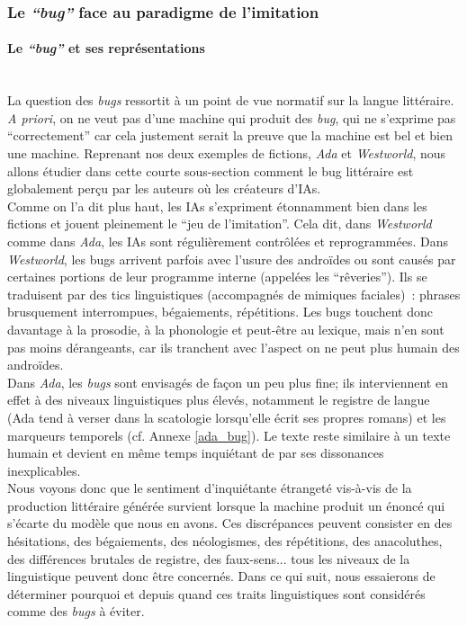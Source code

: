 \documentclass{article}
\newcommand{\subsubsubsection}[1]{\paragraph{#1}\mbox{}\\}
\begin{document}
			\subsubsection{Le \textit{``bug''} face au paradigme de l'imitation}\label{test_turing}
				\subsubsubsection{Le \textit{``bug''} et ses représentations}
					La question des \textit{bugs} ressortit à un point de vue normatif sur la langue littéraire. \textit{A priori}, on ne veut pas d'une machine qui produit des \textit{bug}, qui ne s'exprime pas ``correctement'' car cela justement serait la preuve que la machine est bel et bien une machine. Reprenant nos deux exemples de fictions, \textit{Ada} et \textit{Westworld}, nous allons étudier dans cette courte sous-section comment le bug littéraire est globalement perçu par les auteurs où les créateurs d'IAs.\\
					
					Comme on l'a dit plus haut, les IAs s'expriment étonnamment bien dans les fictions et jouent pleinement le ``jeu de l'imitation''. Cela dit, dans \textit{Westworld} comme dans \textit{Ada}, les IAs sont régulièrement contrôlées et reprogrammées. Dans \textit{Westworld}, les bugs arrivent parfois avec l'usure des androïdes ou sont causés par certaines portions de leur programme interne (appelées les ``rêveries''). Ils se traduisent par des tics linguistiques (accompagnés de mimiques faciales)~: phrases brusquement interrompues, bégaiements, répétitions. Les bugs touchent donc davantage à la prosodie, à la phonologie et peut-être au lexique, mais n'en sont pas moins dérangeants, car ils tranchent avec l'aspect on ne peut plus humain des androïdes.\\
					
					Dans \textit{Ada}, les \textit{bugs} sont envisagés de façon un peu plus fine; ils interviennent en effet à des niveaux linguistiques plus élevés, notamment le registre de langue (Ada tend à verser dans la scatologie lorsqu'elle écrit ses propres romans) et les marqueurs temporels (cf. Annexe \ref{ada_bug}). Le texte reste similaire à un texte humain et devient en même temps inquiétant de par ses dissonances inexplicables.\\
					
					
					Nous voyons donc que le sentiment d'inquiétante étrangeté vis-à-vis de la production littéraire générée survient lorsque la machine produit un énoncé qui s'écarte du modèle que nous en avons. Ces discrépances peuvent consister en des hésitations, des bégaiements, des néologismes, des répétitions, des anacoluthes, des différences brutales de registre, des faux-sens... tous les niveaux de la linguistique peuvent donc être concernés. Dans ce qui suit, nous essaierons de déterminer pourquoi et depuis quand ces traits linguistiques sont considérés comme des \textit{bugs} à éviter.
					
\end{document}
